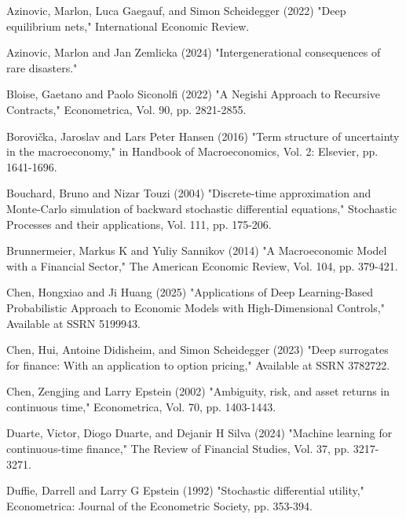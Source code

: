 \documentclass{article}
\begin{document}
\begin{thebibliography}{99}

 Azinovic, Marlon, Luca Gaegauf, and Simon Scheidegger (2022) "Deep equilibrium nets," International Economic Review.

 Azinovic, Marlon and Jan Zemlicka (2024) "Intergenerational consequences of rare disasters."

 Bloise, Gaetano and Paolo Siconolfi (2022) "A Negishi Approach to Recursive Contracts," Econometrica, Vol. 90, pp. 2821-2855.

\clearpage

 Borovička, Jaroslav and Lars Peter Hansen (2016) "Term structure of uncertainty in the macroeconomy," in Handbook of Macroeconomics, Vol. 2: Elsevier, pp. 1641-1696.

 Bouchard, Bruno and Nizar Touzi (2004) "Discrete-time approximation and Monte-Carlo simulation of backward stochastic differential equations," Stochastic Processes and their applications, Vol. 111, pp. 175-206.

 Brunnermeier, Markus K and Yuliy Sannikov (2014) "A Macroeconomic Model with a Financial Sector," The American Economic Review, Vol. 104, pp. 379-421.

 Chen, Hongxiao and Ji Huang (2025) "Applications of Deep Learning-Based Probabilistic Approach to Economic Models with High-Dimensional Controls," Available at SSRN 5199943.

 Chen, Hui, Antoine Didisheim, and Simon Scheidegger (2023) "Deep surrogates for finance: With an application to option pricing," Available at SSRN 3782722.

 Chen, Zengjing and Larry Epstein (2002) "Ambiguity, risk, and asset returns in continuous time," Econometrica, Vol. 70, pp. 1403-1443.

 Duarte, Victor, Diogo Duarte, and Dejanir H Silva (2024) "Machine learning for continuous-time finance," The Review of Financial Studies, Vol. 37, pp. 3217-3271.

 Duffie, Darrell and Larry G Epstein (1992) "Stochastic differential utility," Econometrica: Journal of the Econometric Society, pp. 353-394.


\end{thebibliography}
\end{document}

